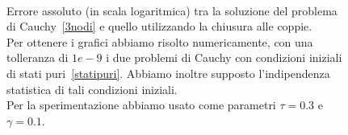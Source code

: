 \begin{figure}[!htb]
\centering
\subfloat[][Nodo 1.]{}
\subfloat[][Nodo 2.]{}
\\
\subfloat[][Nodo 3.]{}
\caption[Errori assoluti relativi al grafo~\ref{fig::3nodi} tra modello esatto e chiuso alle coppie] {Errore assoluto (in scala logaritmica) tra la soluzione del problema di Cauchy~\eqref{3nodi} e quello utilizzando la chiusura alle coppie.\\
Per ottenere i grafici abbiamo risolto numericamente, con una tolleranza di $1e-9$ i due problemi di Cauchy con condizioni iniziali di stati puri~\eqref{statipuri}. Abbiamo inoltre supposto l'indipendenza statistica di tali condizioni iniziali.\\
Per la sperimentazione abbiamo usato come parametri $\tau = 0.3$ e $\gamma = 0.1$. }
\label{fig::errori3nodiPair}
\end{figure}


